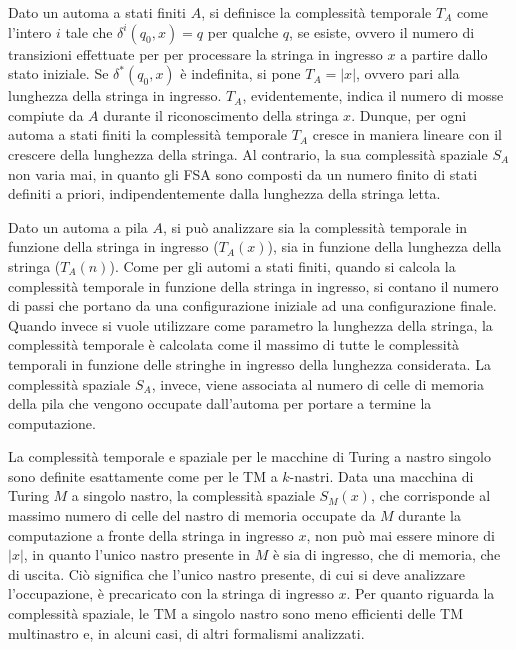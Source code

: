   Dato un automa a stati finiti \(A\), si definisce la complessità temporale \({T}_A\) come l'intero \(i\) tale che \(\delta^i(q_0,x)=q\) per qualche \(q\), se esiste, ovvero il numero di transizioni effettuate per per processare la stringa in ingresso \(x\) a partire dallo stato iniziale. Se \(\delta^*(q_0,x)\) è indefinita, si pone \({T}_A= |x|\), ovvero pari alla lunghezza della stringa in ingresso. \({T}_A\), evidentemente, indica il numero di mosse compiute da \(A\) durante il riconoscimento della stringa \(x\). Dunque, per ogni automa a stati finiti la complessità temporale \({T}_A\) cresce in maniera lineare con il crescere della lunghezza della stringa. Al contrario, la sua complessità spaziale \({S}_A\) non varia mai, in quanto gli FSA sono composti da un numero finito di stati definiti a priori, indipendentemente dalla lunghezza della stringa letta. 

  \vspace*{10px}

  Dato un automa a pila \(A\), si può analizzare sia la complessità temporale in funzione della stringa in ingresso (\({T}_A(x)\)), sia in funzione della lunghezza della stringa (\({T}_A(n)\)). Come per gli automi a stati finiti, quando si calcola la complessità temporale in funzione della stringa in ingresso, si contano il numero di passi che portano da una configurazione iniziale ad una configurazione finale. Quando invece si vuole utilizzare come parametro la lunghezza della stringa, la complessità temporale è calcolata come il massimo di tutte le complessità temporali in funzione delle stringhe in ingresso della lunghezza considerata. La complessità spaziale \({S}_A\), invece, viene associata al numero di celle di memoria della pila che vengono occupate dall'automa per portare a termine la computazione.

  \vspace*{10px}

  La complessità temporale e spaziale per le macchine di Turing a nastro singolo sono definite esattamente come per le TM a \(k\)-nastri. Data una macchina di Turing \(M\) a singolo nastro, la complessità spaziale \({S}_M(x)\), che corrisponde al massimo numero di celle del nastro di memoria occupate da \(M\) durante la computazione a fronte della stringa in ingresso \(x\), non può mai essere minore di \(|x|\), in quanto l'unico nastro presente in \(M\) è sia di ingresso, che di memoria, che di uscita. Ciò significa che l'unico nastro presente, di cui si deve analizzare l'occupazione, è precaricato con la stringa di ingresso \(x\). Per quanto riguarda la complessità spaziale, le TM a singolo nastro sono meno efficienti delle TM multinastro e, in alcuni casi, di altri formalismi analizzati. 
  
